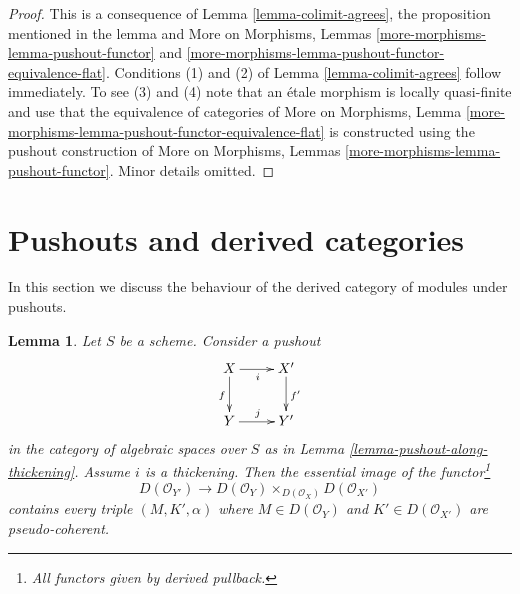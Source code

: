 \documentclass{stacks-project}
\theoremstyle{plain}
\newtheorem{lemma}[subsection]{Lemma}
\theoremstyle{definition}
\theoremstyle{remark}
\numberwithin{equation}{subsection}
\begin{document}
\begin{proof}
This is a consequence of Lemma \ref{lemma-colimit-agrees}, the proposition
mentioned in the lemma and More on Morphisms, Lemmas
\ref{more-morphisms-lemma-pushout-functor} and
\ref{more-morphisms-lemma-pushout-functor-equivalence-flat}.
Conditions (1) and (2) of Lemma \ref{lemma-colimit-agrees}
follow immediately. To see (3) and (4) note that an \'etale morphism
is locally quasi-finite and use that the equivalence of categories of
More on Morphisms, Lemma
\ref{more-morphisms-lemma-pushout-functor-equivalence-flat}
is constructed using the pushout construction of
More on Morphisms, Lemmas \ref{more-morphisms-lemma-pushout-functor}.
Minor details omitted.
\end{proof}








\section{Pushouts and derived categories}
\label{section-pushouts-derived}

\noindent
In this section we discuss the behaviour of the derived
category of modules under pushouts.

\begin{lemma}
\label{lemma-pushout-along-thickening-derived}
Let $S$ be a scheme. Consider a pushout
$$
\xymatrix{
X \ar[r]_i \ar[d]_f & X' \ar[d]^{f'}
\\
Y \ar[r]^j & Y'
}
$$
in the category of algebraic spaces over $S$
as in Lemma \ref{lemma-pushout-along-thickening}.
Assume $i$ is a thickening. Then the essential
image of the functor\footnote{All functors given by derived pullback.}
$$
D(\mathcal{O}_{Y'}) \longrightarrow
D(\mathcal{O}_Y) \times_{D(\mathcal{O}_X)} D(\mathcal{O}_{X'})
$$
contains every triple $(M, K', \alpha)$ where $M \in D(\mathcal{O}_Y)$
and $K' \in D(\mathcal{O}_{X'})$ are pseudo-coherent.
\end{lemma}
\end{document}
